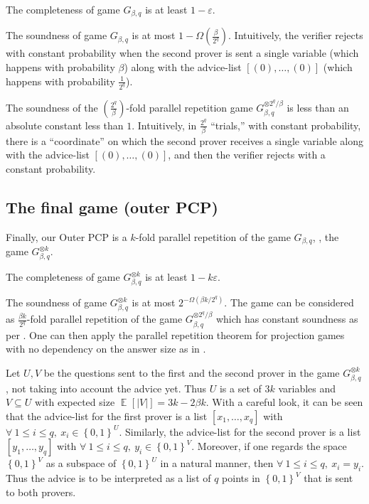 \documentclass{toc}
\newcommand\set[1]{{\left\{ #1 \right\}}}
\newcommand\power[1]{\set{0,1}^{#1}}
\newcommand\Expect[2]{{\mathop{\mathbb{E}}_{#1}\left[ {#2} \right]}}
\newcommand\eps{\varepsilon}
\renewcommand\leq{\leqslant}
\begin{document}
\smallskip
{} The completeness of game $G_{\beta, q}$ is at least $1-\eps$.

\smallskip
{} The soundness of game $G_{\beta, q}$ is at most $1- \Omega\left(\frac{\beta}{2^q}\right)$. Intuitively,
the verifier rejects with constant probability when the second prover is sent a single variable (which happens with probability $\beta$)
along with the advice-list $[(0), \ldots, (0)]$ (which happens with probability $\frac{1}{2^q}$).

\begin{remark}\label{remark:constant_rej}
The soundness of the $\left(\frac{2^q}{\beta} \right)$-fold parallel
repetition game $G_{\beta, q}^{\otimes 2^q/\beta}$ is
%
less than %
an absolute constant less than $1$. Intuitively, in $\frac{2^q}{\beta}$ ``trials,''
with constant probability, there is a  ``coordinate'' on which
the second prover receives a single variable
along with the advice-list $[(0), \ldots, (0)]$,
and then the verifier rejects with a constant probability.
\end{remark}

\subsection{The final game (outer PCP) }\label{final_game}\label{sec:final-outer-pcp}

Finally, our Outer PCP is a $k$-fold parallel repetition of the game $G_{\beta, q}$, \ie, the game $G_{\beta, q}^{\otimes k}$.

\smallskip
{} The completeness of game $G_{\beta, q}^{\otimes k}$ is at least $1-k\eps$.

\smallskip
{} The soundness of game $G_{\beta, q}^{\otimes k} $ is at most $2^{-\Omega(\beta k/2^q)}$. The game can be considered
as $\frac{\beta k}{2^q}$-fold parallel repetition of the game $G_{\beta, q}^{\otimes 2^q/\beta}$ which has constant soundness as per
. One can then apply the parallel repetition theorem for
projection games with no dependency on the answer size as in \cite{Rao,DS14}.

\begin{remark} Let $U, V$ be the questions sent to the first and the second prover in the game $G_{\beta, q}^{\otimes k}$, not taking into
account the advice yet. Thus $U$ is a set of $3k$ variables and $V \subseteq U$ with expected size $\Expect{}{|V|} = 3k - 2\beta k$.
With a careful look, it can be seen that the advice-list for the first prover is a list $[x_1,\ldots, x_q]$ with $\forall ~1\leq i \leq q,
~ x_i \in \power{U}$. Similarly, the advice-list for the second prover is a list $[y_1,\ldots, y_q]$ with $\forall ~1\leq i \leq q,
~ y_i \in \power{V}$. Moreover, if one regards the space $\power{V}$ as a subspace of $\power{U}$ in a natural manner, then
$\forall ~1\leq i \leq q, ~x_i = y_i$. Thus the advice is to be interpreted as a list of $q$ points in $\power{V}$ that is sent to both provers.
\end{remark}
\end{document}
